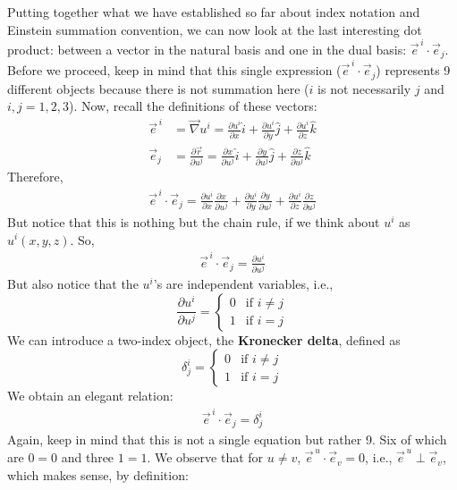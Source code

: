 \documentclass{article}
\theoremstyle{definition}
\begin{document}
Putting together what we have established so far about index notation and Einstein summation convention, we can now look at the last interesting dot product: between a vector in the natural basis and one in the dual basis: $\vec{e}^{\,i}\cdot\vec{e}_j$. Before we proceed, keep in mind that this single expression ($\vec{e}^{\,i}\cdot\vec{e}_j$) represents 9 different objects because there is not summation here ($i$ is not necessarily $j$ and $i,j=1,2,3$). Now, recall the definitions of these vectors:
\begin{align*}
\vec{e}^{\,i} &= \vec{\nabla}u^i = \frac{\partial u^i}{\partial x}\hat{i} + \frac{\partial u^i}{\partial y}\hat{j} + \frac{\partial u^i}{\partial z}\hat{k}\\
\vec{e}_j &= \frac{\partial \vec{r}}{\partial u^j} = \frac{\partial x}{\partial u^j}\hat{i} + \frac{\partial y}{\partial u^j}\hat{j} + \frac{\partial z}{\partial u^j}\hat{k}
\end{align*}
Therefore,
\begin{align*}
\vec{e}^{\,i}\cdot\vec{e}_j = \frac{\partial u^i}{\partial x}\frac{\partial x}{\partial u^j} + \frac{\partial u^i}{\partial y}\frac{\partial y}{\partial u^j} + \frac{\partial u^i}{\partial z}\frac{\partial z}{\partial u^j}
\end{align*}
But notice that this is nothing but the chain rule, if we think about $u^i$ as $u^i(x,y,z)$. So,
\begin{align*}
\boxed{\vec{e}^{\,i}\cdot\vec{e}_j = \frac{\partial u^i}{\partial u^j}}
\end{align*}
But also notice that the $u^i$'s are independent variables, i.e.,
\[ \frac{\partial u^i}{\partial u^j} = 
\begin{cases*}
0 & \text{if $i \neq j$} \\
1 & \text{if $i = j$}
\end{cases*}\]
We can introduce a two-index object, the \textbf{Kronecker delta}, defined as
\[ \boxed{\delta^i_j = 
\begin{cases*}
	0 & \text{if $i \neq j$} \\
	1 & \text{if $i = j$}
\end{cases*}}\]
We obtain an elegant relation:
\begin{align*}
\boxed{\vec{e}^{\,i}\cdot\vec{e}_j = \delta^i_j}
\end{align*}
Again, keep in mind that this is not a single equation but rather 9. Six of which are $0=0$ and three $1=1$. We observe that for $u\neq v$, $\vec{e}^{\,u}\cdot\vec{e}_v = 0$, i.e., $\vec{e}^{\,u} \perp \vec{e}_v$, which makes sense, by definition: 
\end{document}
